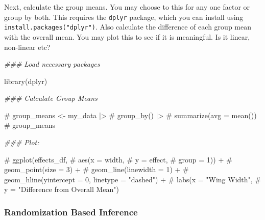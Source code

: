 \documentclass[
  letterpaper,
  DIV=11,
  numbers=noendperiod]{scrartcl}
\newenvironment{Shaded}{\begin{snugshade}}{\end{snugshade}}
\newcommand{\CommentTok}[1]{\textcolor[rgb]{0.37,0.37,0.37}{#1}}
\newcommand{\DocumentationTok}[1]{\textcolor[rgb]{0.37,0.37,0.37}{\textit{#1}}}
\newcommand{\FunctionTok}[1]{\textcolor[rgb]{0.28,0.35,0.67}{#1}}
\newcommand{\NormalTok}[1]{\textcolor[rgb]{0.00,0.23,0.31}{#1}}
\begin{document}
Next, calculate the group means. You may choose to this for any one
factor or group by both. This requires the \texttt{dplyr} package, which
you can install using \texttt{install.packages("dplyr")}. Also calculate
the difference of each group mean with the overall mean. You may plot
this to see if it is meaningful. Is it linear, non-linear etc?

\begin{Shaded}
\begin{Highlighting}[]
\DocumentationTok{\#\#\# Load necessary packages}

\FunctionTok{library}\NormalTok{(dplyr)}

\DocumentationTok{\#\#\# Calculate Group Means}

\CommentTok{\# group\_means \textless{}{-} my\_data |\textgreater{}}
\CommentTok{\#   group\_by() |\textgreater{}}
\CommentTok{\#   summarize(avg = mean())}
\CommentTok{\# group\_means}
\end{Highlighting}
\end{Shaded}

\begin{Shaded}
\end{Shaded}

\begin{Shaded}
\begin{Highlighting}[]
\DocumentationTok{\#\#\# Plot:}

\CommentTok{\# ggplot(effects\_df,}
\CommentTok{\#        aes(x = width,}
\CommentTok{\#            y = effect,}
\CommentTok{\#            group = 1)) +}
\CommentTok{\#   geom\_point(size = 3) +}
\CommentTok{\#   geom\_line(linewidth = 1) +}
\CommentTok{\#   geom\_hline(yintercept = 0, linetype = "dashed") +}
\CommentTok{\#   labs(x = "Wing Width",}
\CommentTok{\#        y = "Difference from Overall Mean")}
\end{Highlighting}
\end{Shaded}

\subsubsection{Randomization Based
Inference}\label{randomization-based-inference}
\end{document}
